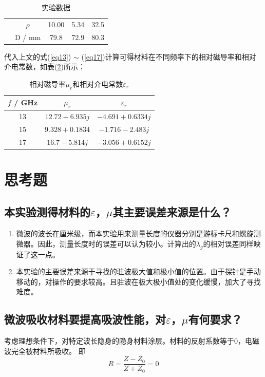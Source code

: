 \documentclass[a4paper]{article}
\begin{document}
\begin{table}[!h]
\begin{tabular}{|c|c|c|c|c|}
		                                                              & \cellcolor[HTML]{EFEFEF}$\rho$ & \cellcolor[HTML]{EFEFEF}10.00 & \cellcolor[HTML]{EFEFEF}5.34  & \cellcolor[HTML]{EFEFEF}32.5 	\\ \cline{2-5}\hhline{~|----|}
		\multirow{-4}{*}{开路}                                        & \cellcolor[HTML]{EFEFEF}D / mm & \cellcolor[HTML]{EFEFEF}79.8  & \cellcolor[HTML]{EFEFEF}72.9  & \cellcolor[HTML]{EFEFEF}80.3	\\ \hline
	\end{tabular}
	\caption{实验数据}\label{table1:data}
\end{table}


代入上文的式(\ref{eq13}) $\sim$ (\ref{eq17})计算可得材料在不同频率下的相对磁导率和相对介电常数，如表(\ref{table2:mu_r and epsilon_r})所示：
\begin{table}[!h]
	\centering
	\begin{tabular}{|c|c|c|}
		\hline
		$f$ / GHz & $\mu_r$             & $\varepsilon_r$     \\ \hline
		13         & $12.72-6.935j$   & $-4.691+0.6334j$ \\ \hline
		15        & $ 9.328+0.1834$   & $ -1.716-2.483j$  \\ \hline
		17        & $ 16.7-5.814j$ & $ -3.056+0.6152j$   \\ \hline
	\end{tabular}
	\caption{相对磁导率$\mu_r$和相对介电常数$\varepsilon_r$}\label{table2:mu_r and epsilon_r}
\end{table}

\section{思考题}
\subsection{本实验测得材料的$\varepsilon$，$\mu$其主要误差来源是什么？}
\begin{enumerate}
	\item 微波的波长在厘米级，而本实验用来测量长度的仪器分别是游标卡尺和螺旋测微器。因此，测量长度时的误差可以认为较小。计算出的$\lambda_g$的相对误差同样映证了这一点。
	\item 本实验的主要误差来源于寻找的驻波极大值和极小值的位置。由于探针是手动移动的，对操作的要求较高。且驻波在极大极小值处的变化缓慢，加大了寻找难度。
\end{enumerate}
\subsection{微波吸收材料要提高吸波性能，对$\varepsilon$，$\mu$有何要求？}
考虑理想条件下，对特定波长隐身的隐身材料涂层。材料的反射系数等于0，电磁波完全被材料所吸收。
即
\begin{equation}
	R =  \frac{Z - Z_0}{Z + Z_0} = 0
\end{equation}
\end{document}
